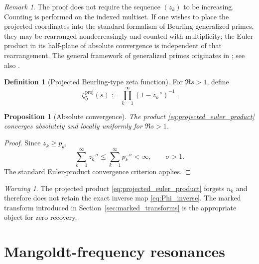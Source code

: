 \documentclass[11pt]{amsart}
\numberwithin{equation}{section}
\theoremstyle{plain}
\newtheorem{proposition}[theorem]{Proposition}
\theoremstyle{definition}
\newtheorem{definition}[theorem]{Definition}
\theoremstyle{remark}
\newtheorem{remark}[theorem]{Remark}
\newtheorem{warning}[theorem]{Warning}
\newcommand{\ZP}{\mathfrak Z}
\begin{document}
\begin{remark}
\label{rem:ordering_not_required}
The proof does not require the sequence $(z_k)$ to be increasing.  Counting
is performed on the indexed multiset.  If one wishes to place the projected
coordinates into the standard formalism of Beurling generalized primes, they
may be rearranged nondecreasingly and counted with multiplicity; the Euler
product in its half-plane of absolute convergence is independent of that
rearrangement.  The general framework of generalized primes originates in
\cite{Beurling1937}; see also \cite{Diamond1969}.
\end{remark}

\begin{definition}[Projected Beurling-type zeta function]
\label{def:projected_zeta_function}
For $\Re s>1$, define
\begin{equation}
 \zeta_{\ZP}^{\mathrm{proj}}(s)
 :=\prod_{k=1}^{\infty}(1-z_k^{-s})^{-1}.
 \label{eq:projected_euler_product}
\end{equation}
\end{definition}

\begin{proposition}[Absolute convergence]
\label{prop:projected_absolute_convergence}
The product \eqref{eq:projected_euler_product} converges absolutely and
locally uniformly for $\Re s>1$.
\end{proposition}

\begin{proof}
Since $z_k\geq p_k$,
\begin{equation}
 \sum_{k=1}^{\infty}z_k^{-\sigma}
 \leq\sum_{k=1}^{\infty}p_k^{-\sigma}<\infty,
 \qquad \sigma>1.
 \label{eq:absolute_convergence_comparison}
\end{equation}
The standard Euler-product convergence criterion applies.
\end{proof}

\begin{warning}
\label{warn:projected_product_forgets_marks}
The projected product \eqref{eq:projected_euler_product} forgets $n_k$ and
therefore does not retain the exact inverse map \eqref{eq:Phi_inverse}.  The
marked transform introduced in Section~\ref{sec:marked_transforms} is the
appropriate object for zero recovery.
\end{warning}

\section{Mangoldt-frequency resonances}
\label{sec:mangoldt_resonances}
\end{document}

